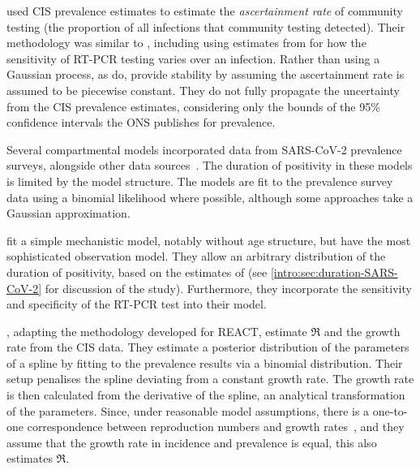 \documentclass[thesis.tex]{subfiles}
\begin{document}
\Textcite{colmanAscertainment} used CIS prevalence estimates to estimate the \emph{ascertainment rate} of community testing (the proportion of all infections that community testing detected).
Their methodology was similar to \textcite{abbottCISincidence}, including using estimates from \textcite{hellewellPCRSensitivity} for how the sensitivity of RT-PCR testing varies over an infection.
Rather than using a Gaussian process, as \textcite{abbottCISincidence} do, \textcite{colmanAscertainment} provide stability by assuming the ascertainment rate is assumed to be piecewise constant.
They do not fully propagate the uncertainty from the CIS prevalence estimates, considering only the bounds of the 95\% confidence intervals the ONS publishes for prevalence.

Several compartmental models incorporated data from SARS-CoV-2 prevalence surveys, alongside other data sources~\autocite{daviesAssociation,ironsEstimating,knockKey,nicholsonImproving,pooleyEstimation,birrellRTM2}.
The duration of positivity in these models is limited by the model structure.
The models are fit to the prevalence survey data using a binomial likelihood where possible, although some approaches take a Gaussian approximation.

\Textcite{nicholsonImproving} fit a simple mechanistic model, notably without age structure, but have the most sophisticated observation model.
They allow an arbitrary distribution of the duration of positivity, based on the estimates of \textcite{hellewellPCRSensitivity} (see \cref{intro:sec:duration-SARS-CoV-2} for discussion of the \textcite{hellewellPCRSensitivity} study).
Furthermore, they incorporate the sensitivity and specificity of the RT-PCR test into their model.

\Textcite{mccabeCISincidence}, adapting the methodology \textcite{ealesAppropriately} developed for REACT, estimate $\Re$ and the growth rate from the CIS data.
They estimate a posterior distribution of the parameters of a spline by fitting to the prevalence results via a binomial distribution.
Their setup penalises the spline deviating from a constant growth rate.
The growth rate is then calculated from the derivative of the spline, an analytical transformation of the parameters.
Since, under reasonable model assumptions, there is a one-to-one correspondence between reproduction numbers and growth rates~\autocite{wallingaGI}, and they assume that the growth rate in incidence and prevalence is equal, this also estimates $\Re$.
\end{document}
